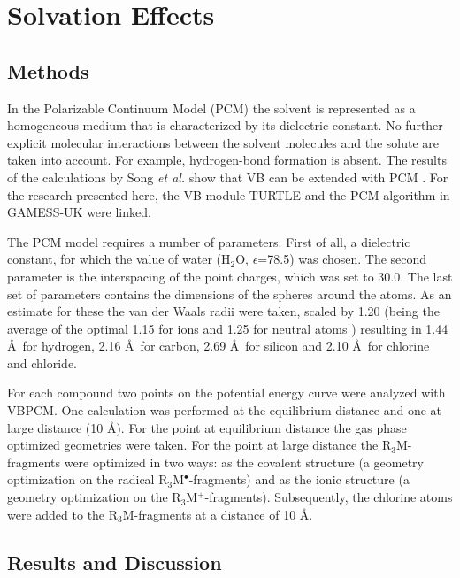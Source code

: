 \section{\label{ch3.sec.solv}Solvation Effects}

\subsection{Methods}

In the Polarizable Continuum Model (PCM) the solvent is represented as a homogeneous medium that is characterized by its dielectric constant. No further explicit molecular interactions between the solvent molecules and the solute are taken into account. For example, hydrogen-bond formation is absent. The results of the calculations by Song \textit{et al.} show that VB can  be extended with PCM \cite{song}. For the research presented here, the VB module TURTLE and the PCM algorithm in GAMESS-UK were linked.

The PCM model requires a number of parameters. First of all, a dielectric constant, for which the value of water (H$_2$O, $\epsilon$=78.5) was chosen. The second parameter is the interspacing of the point charges, which was set to 30.0\degrees. The last set of parameters contains the dimensions of the spheres around the atoms. As an estimate for these the van der Waals radii \cite{bondi} were taken, scaled by 1.20 (being the average of the optimal 1.15 for ions and 1.25 for neutral atoms \cite{scaling}) resulting in 1.44 \AA\  for hydrogen, 2.16 \AA\  for carbon, 2.69 \AA\ for silicon and 2.10 \AA\ for chlorine and chloride.

For each compound two points on the potential energy curve were analyzed with VBPCM. One calculation was performed at the equilibrium distance and one at large distance (10 \AA). For the point at equilibrium distance the gas phase optimized geometries were taken. For the point at large distance the R$_3$M-fragments were optimized in two ways: as the covalent structure (a geometry optimization on the radical R$_3$M$^\bullet$-fragments) and as the ionic structure (a geometry optimization on the R$_3$M$^{+}$-fragments). Subsequently, the chlorine atoms were added to the R$_3$M-fragments at a distance of 10 \AA. 

\subsection{Results and Discussion}


